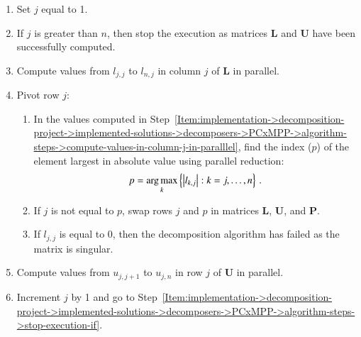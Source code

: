 \begin{enumerate}
	\item Set $j$ equal to 1.
	\item \label{Item:implementation->decomposition-project->implemented-solutions->decomposers->PCxMPP->algorithm-steps->stop-execution-if}
		If $j$ is greater than $n$, then stop the execution as matrices $\mathbf{L}$ and $\mathbf{U}$ have been successfully computed.
	\item \label{Item:implementation->decomposition-project->implemented-solutions->decomposers->PCxMPP->algorithm-steps->compute-values-in-column-j-in-paralllel}
		Compute values from $l_{j,j}$ to $l_{n,j}$ in column $j$ of $\mathbf{L}$ \colorbox{nvidia-light}{in parallel}.
	\item Pivot row $j$:
	\begin{enumerate}
		\item \label{Item:implementation->decomposition-project->implemented-solutions->decomposers->PCxMPP->algorithm-steps->piv-row-j-maxarg-in-paralllel}
			In the values computed in Step~\ref{Item:implementation->decomposition-project->implemented-solutions->decomposers->PCxMPP->algorithm-steps->compute-values-in-column-j-in-paralllel}, find the index ($p$) of the element largest in absolute value \colorbox{nvidia-light}{using parallel reduction}:
		\begin{equation}
			p = \operatorname*{arg\,max}_k \left\{ \left| l_{k, j} \right|: k=j,\dots, n \right\} \,.
		\end{equation}
		\item If $j$ is not equal to $p$, swap rows $j$ and $p$ in matrices $\mathbf{L}$, $\mathbf{U}$, and $\mathbf{P}$.
		\item If $l_{j,j}$ is equal to 0, then the decomposition algorithm has failed as the matrix is singular.
	\end{enumerate}
	\item \label{Item:implementation->decomposition-project->implemented-solutions->decomposers->PCxMPP->algorithm-steps->compute-values-in-row-j-in-paralllel}
		Compute values from $u_{j,j+1}$ to $u_{j,n}$ in row $j$ of $\mathbf{U}$ \colorbox{nvidia-light}{in parallel}.
	\item Increment $j$ by 1 and go to Step~\ref{Item:implementation->decomposition-project->implemented-solutions->decomposers->PCxMPP->algorithm-steps->stop-execution-if}.
\end{enumerate}

